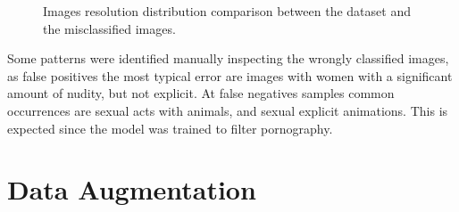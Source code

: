 \begin{figure}[]
	\centering
	\qquad\qquad
    \caption{Images resolution distribution comparison between the dataset and the misclassified images.}
    \label{fig:images_resolution_comparison}
\end{figure}





Some patterns were identified manually inspecting the wrongly classified images, as false positives the most typical error are images with women with a significant amount of nudity, but not explicit. At false negatives samples common occurrences are sexual acts with animals, and sexual explicit animations. This is expected since the model was trained to filter pornography.



\section{Data Augmentation}

